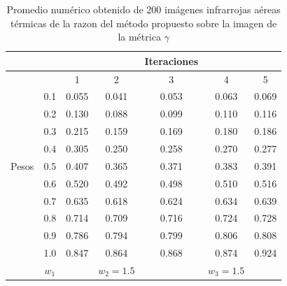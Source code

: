 \documentclass[a4paper, 11 pt, conference]{ieeeconf}      %
\begin{document}
\begin{table}[h]
\centering
\tiny
\caption{Promedio num\'erico obtenido de 200 im\'agenes infrarrojas a\'ereas t\'ermicas de la razon del m\'etodo propuesto sobre la imagen de la m\'etrica $\gamma$}
\label{tabla_7}
\begin{center}
\begin{tabular}{ c c c c c c c }
\hline
&  &  &  & Iteraciones &  & \\
\hline
 &     & 1 & 2 & 3 & 4 & 5 \\
\hline
 & \vline \hspace{1} 0.1 \hspace{1} \vline & 0.055 & 0.041 & 0.053 & 0.063 & 0.069 \\
 & \vline \hspace{1} 0.2 \hspace{1} \vline & 0.130 & 0.088 & 0.099 & 0.110 & 0.116 \\
 & \vline \hspace{1} 0.3 \hspace{1} \vline & 0.215 & 0.159  & 0.169 & 0.180 & 0.186  \\
 & \vline \hspace{1} 0.4 \hspace{1} \vline & 0.305 & 0.250 & 0.258 & 0.270 & 0.277 \\
Pesos & \vline \hspace{1} 0.5 \hspace{1} \vline & 0.407 & 0.365 & 0.371 & 0.383 & 0.391   \\
 & \vline \hspace{1} 0.6 \hspace{1} \vline & 0.520 & 0.492 & 0.498 & 0.510 & 0.516 \\
 & \vline \hspace{1} 0.7 \hspace{1} \vline & 0.635 & 0.618 & 0.624 & 0.634 & 0.639 \\
 & \vline \hspace{1} 0.8 \hspace{1} \vline & 0.714 & 0.709 & 0.716 & 0.724 & 0.728 \\
 & \vline \hspace{1} 0.9 \hspace{1} \vline & 0.786 & 0.794 & 0.799 & 0.806 & 0.808 \\
 & \vline \hspace{1} 1.0 \hspace{1} \vline & 0.847 & 0.864 & 0.868 & 0.874 & 0.924 \\
\hline
& $w_{1}$ & & $w_{2}=1.5$ & & $w_{3}=1.5$ &  \\
\hline
\end{tabular}
\end{center}
\end{table}
\end{document}
